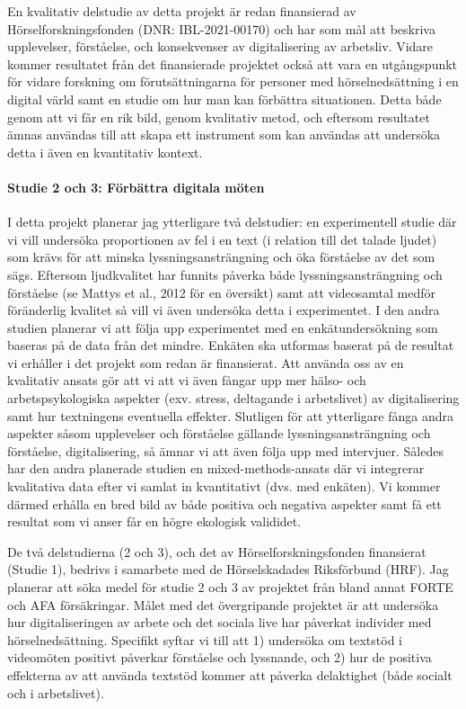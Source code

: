 \documentclass[]{article}
\begin{document}
En kvalitativ delstudie av detta projekt är redan finansierad av
Hörselforskningsfonden (DNR: IBL-2021-00170) och har som mål att
beskriva upplevelser, förståelse, och konsekvenser av digitalisering av
arbetsliv. Vidare kommer resultatet från det finansierade projektet
också att vara en utgångspunkt för vidare forskning om förutsättningarna
för personer med hörselnedsättning i en digital värld samt en studie om
hur man kan förbättra situationen. Detta både genom att vi får en rik
bild, genom kvalitativ metod, och eftersom resultatet ämnas användas
till att skapa ett instrument som kan användas att undersöka detta i
även en kvantitativ kontext.

\hypertarget{studie-2-och-3-fuxf6rbuxe4ttra-digitala-muxf6ten}{%
\paragraph{Studie 2 och 3: Förbättra digitala
möten}\label{studie-2-och-3-fuxf6rbuxe4ttra-digitala-muxf6ten}}

I detta projekt planerar jag ytterligare två delstudier: en
experimentell studie där vi vill undersöka proportionen av fel i en text
(i relation till det talade ljudet) som krävs för att minska
lyssningsansträngning och öka förståelse av det som sägs. Eftersom
ljudkvalitet har funnits påverka både lyssningsansträngning och
förståelse (se Mattys et al., 2012 för en översikt) samt att videosamtal
medför föränderlig kvalitet så vill vi även undersöka detta i
experimentet. I den andra studien planerar vi att följa upp experimentet
med en enkätundersökning som baseras på de data från det mindre. Enkäten
ska utformas baserat på de resultat vi erhåller i det projekt som redan
är finansierat. Att använda oss av en kvalitativ ansats gör att vi att
vi även fångar upp mer hälso- och arbetspsykologiska aspekter (exv.
stress, deltagande i arbetslivet) av digitalisering samt hur textningens
eventuella effekter. Slutligen för att ytterligare fånga andra aspekter
såsom upplevelser och förståelse gällande lyssningsansträngning och
förståelse, digitalisering, så ämnar vi att även följa upp med
intervjuer. Således har den andra planerade studien en
mixed-methods-ansats där vi integrerar kvalitativa data efter vi samlat
in kvantitativt (dvs. med enkäten). Vi kommer därmed erhålla en bred
bild av både positiva och negativa aspekter samt få ett resultat som vi
anser får en högre ekologisk valididet.

De två delstudierna (2 och 3), och det av Hörselforskningsfonden
finansierat (Studie 1), bedrivs i samarbete med de Hörselskadades
Riksförbund (HRF). Jag planerar att söka medel för studie 2 och 3 av
projektet från bland annat FORTE och AFA försäkringar. Målet med det
övergripande projektet är att undersöka hur digitaliseringen av arbete
och det sociala live har påverkat individer med hörselnedsättning.
Specifikt syftar vi till att 1) undersöka om textstöd i videomöten
positivt påverkar förståelse och lyssnande, och 2) hur de positiva
effekterna av att använda textstöd kommer att påverka delaktighet (både
socialt och i arbetslivet).
\end{document}
